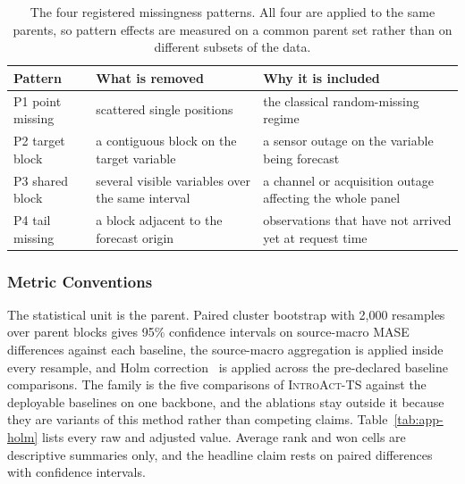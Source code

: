 \documentclass{article}
\newcommand{\introact}{\textsc{IntroAct-TS}}
\begin{document}
\begin{table}[h]
  \caption{The four registered missingness patterns. All four are applied to the same parents,
  so pattern effects are measured on a common parent set rather than on different subsets of
  the data.}
  \label{tab:app-patterns}
  \centering
  \small
  \setlength{\tabcolsep}{4pt}
\begin{tabular}{@{}l p{} p{}@{}}
    \toprule
    Pattern & What is removed & Why it is included \\
    \midrule
    P1 point missing    & scattered single positions & the classical random-missing regime \\
    P2 target block     & a contiguous block on the target variable & a sensor outage on the variable being forecast \\
    P3 shared block     & several visible variables over the same interval & a channel or acquisition outage affecting the whole panel \\
    P4 tail missing     & a block adjacent to the forecast origin & observations that have not arrived yet at request time \\
    \bottomrule
  \end{tabular}
\end{table}

\subsubsection{Metric Conventions}
\label{app:metric-conventions}
The statistical unit is the parent. Paired cluster bootstrap with 2,000 resamples
over parent blocks gives 95\% confidence intervals on source-macro MASE differences against
each baseline, the source-macro aggregation is applied inside every resample, and Holm
correction~\citep{holm1979simple} is applied across the pre-declared baseline comparisons.
The family is the five comparisons of \introact{} against the deployable baselines on one
backbone, and the ablations stay outside it because they are variants of this method rather
than competing claims. Table~\ref{tab:app-holm} lists every raw and adjusted value.
Average rank and won cells are descriptive summaries only, and the headline claim rests on
paired differences with confidence intervals.
\end{document}
